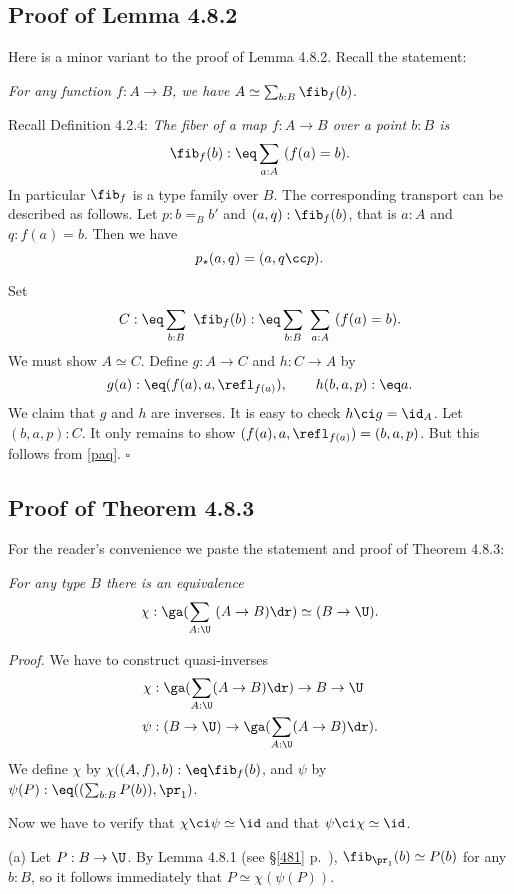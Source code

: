 \documentclass[12pt]{article}
\begin{document}

\subsection{Proof of Lemma 4.8.2}\label{482}

Here is a minor variant to the proof of Lemma 4.8.2. Recall the statement:

\emph{For any function $f:A\to B$, we have} $A\simeq\sum_{b:B}\fib_f(b)$.

Recall Definition 4.2.4: \emph{The fiber of a map $f:A\to B$ over a point $b:B$ is} 
$$
\fib_f(b):\eq\sum_{a:A}\ (f(a)=b).
$$ 
In particular $\fib_f$ is a type family over $B$. The corresponding transport can be described as follows. Let $p:b=_Bb'$ and $(a,q):\fib_f(b)$, that is $a:A$ and $q:f(a)=b$. Then we have 
\begin{equation}\label{paq}
p_\star(a,q)=(a,q\cc p).
\end{equation}

Set 
$$
C:\eq\sum_{b:B}\ \fib_f(b):\eq\sum_{b:B}\ \sum_{a:A}\ (f(a)=b).
$$ 
We must show $A\simeq C$. Define $g:A\to C$ and $h:C\to A$ by 
$$
g(a):\eq(f(a),a,\refl_{f(a)}),\qquad h(b,a,p):\eq a.
$$ 
We claim that $g$ and $h$ are inverses. It is easy to check $h\ci g=\id_A$. Let $(b,a,p):C$. It only remains to show $(f(a),a,\refl_{f(a)})=(b,a,p)$. But this follows from \eqref{paq}. $\square$


\subsection{Proof of Theorem 4.8.3}

For the reader's convenience we paste the statement and proof of Theorem 4.8.3:

\nn{} \emph{For any type $B$ there is an equivalence}
$$
\chi:\ga(\sum_{A:\U}\ (A\to B)\dr)\simeq(B\to\U).
$$

\nn\emph{Proof.} We have to construct quasi-inverses
\begin{align*}
\chi&:\ga(\sum_{A:\U}(A\to B)\dr)\to B\to\U\\
\psi&:(B\to\U)\to\ga(\sum_{A:\U}(A\to B)\dr).
\end{align*}
We define $\chi$ by $\chi((A,f),b):\eq\fib_f(b)$, and $\psi$ by $\psi(P):\eq((\sum_{b:B} P(b)),\pr_1)$. 

Now we have to verify that $\chi\ci\psi\simeq\id$ and that $\psi\ci\chi\simeq\id$. 

\nn(a) Let $P:B\to\U$. By Lemma 4.8.1 (see \S\ref{481} p.~\pageref{481}), $\fib_{\pr_1}(b)\simeq P(b)$ for any $b:B$, so it follows immediately that $P\simeq\chi(\psi(P))$.
\end{document}
